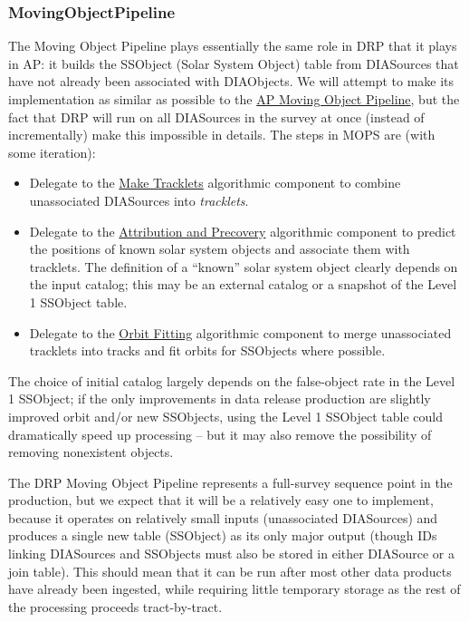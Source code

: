 \subsubsection{MovingObjectPipeline}
\label{sec:drpMovingObjectPipeline}

The Moving Object Pipeline plays essentially the same role in DRP that it plays in AP: it builds the SSObject (Solar System Object) table from DIASources that have not already been associated with DIAObjects.  We will attempt to make its implementation as similar as possible to the \hyperref[sec:apMovingObjectPipeline]{AP Moving Object Pipeline}, but the fact that DRP will run on all DIASources in the survey at once (instead of incrementally) make this impossible in details.  The steps in MOPS are (with some iteration):

\begin{itemize}
\item Delegate to the \hyperref[sec:acMakeTracklets]{Make Tracklets} algorithmic component to combine unassociated DIASources into \emph{tracklets}.
\item Delegate to the \hyperref[sec:acAttributionAndPrecovery]{Attribution and Precovery} algorithmic component to predict the positions of known solar system objects and associate them with tracklets.  The definition of a ``known'' solar system object clearly depends on the input catalog; this may be an external catalog or a snapshot of the Level 1 SSObject table.
\item Delegate to the \hyperref[sec:acOrbitFitting]{Orbit Fitting} algorithmic component to merge unassociated tracklets into tracks and fit orbits for SSObjects where possible.
\end{itemize}

The choice of initial catalog largely depends on the false-object rate in the Level 1 SSObject; if the only improvements in data release production are slightly improved orbit and/or new SSObjects, using the Level 1 SSObject table could dramatically speed up processing -- but it may also remove the possibility of removing nonexistent objects.

The DRP Moving Object Pipeline represents a full-survey sequence point in the production, but we expect that it will be a relatively easy one to implement, because it operates on relatively small inputs (unassociated DIASources) and produces a single new table (SSObject) as its only major output (though IDs linking DIASources and SSObjects must also be stored in either DIASource or a join table).  This should mean that it can be run after most other data products have already been ingested, while requiring little temporary storage as the rest of the processing proceeds tract-by-tract.

